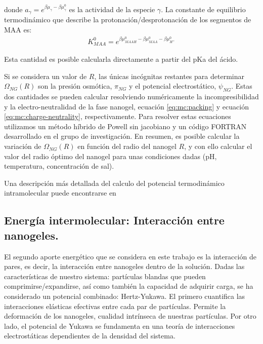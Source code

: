 	\noindent donde $a_\gamma = e^{\beta\mu_\gamma-\beta\mu_\gamma^0}$ es la actividad de la especie $\gamma$. 
	La constante de equilibrio termodin\'amico que describe la protonaci\'on/desprotonaci\'on de los segmentos de MAA es:
	\begin{align}
		K^0_{MAA}= e^{\beta\mu^0_{MAAH}-\beta\mu^0_{MAA}-\beta\mu^0_{H^+}}
	\end{align}
	
	\noindent Esta cantidad es posible calcularla directamente a partir del pKa del \'acido.
	
	
	Si se considera  un valor de  $R$, las \'unicas inc\'ognitas restantes para determinar $\Omega_{NG}(R)$ son la presi\'on osm\'otica, $\pi_{NG}$ y el potencial electrost\'atico, $\psi_{NG}$.
	Estas dos cantidades se pueden calcular resolviendo num\'ericamente la incompresibilidad y la electro-neutralidad de la fase nanogel, ecuaci\'on \ref{eq:mc:packing} y ecuaci\'on \ref{eq:mc:charge-neutrality}, respectivamente.
	Para resolver estas ecuaciones utilizamos un m\'etodo h\'ibrido de Powell sin jacobiano y un c\'odigo FORTRAN desarrollado en el grupo de investigaci\'on.
	En resumen, es posible calcular la variaci\'on de  $\Omega_{NG}(R)$ en funci\'on del radio del nanogel $R$, y con ello calcular el valor del radio \'optimo del nanogel para unas condiciones dadas (pH, temperatura, concentraci\'on de sal).
	
	Una descripci\'on m\'as detallada del calculo del potencial termodin\'amico intramolecular puede encontrarse en \cite{perez2021thermodynamic}
	
	\subsection{Energ\'ia intermolecular: Interacci\'on entre nanogeles.}\label{sec:mc:energia_intra}
	
	El segundo aporte energ\'etico que se considera en este trabajo es la interacci\'on de pares, es decir, la interacci\'on entre nanogeles dentro de la soluci\'on.
	Dadas las caracter\'isticas de nuestro sistema: part\'iculas blandas que pueden comprimirse/expandirse, as\'i como tambi\'en la capacidad de adquirir carga, se ha considerado un potencial combinado: Hertz-Yukawa.
	El primero cuantifica las interacciones el\'asticas efectivas entre cada par de part\'iculas. Permite la deformaci\'on de los nanogeles, cualidad intr\'inseca de nuestras part\'iculas.
	Por otro lado, el potencial de Yukawa se fundamenta en una teor\'ia de interacciones electrost\'aticas dependientes de la densidad del sistema.
	
